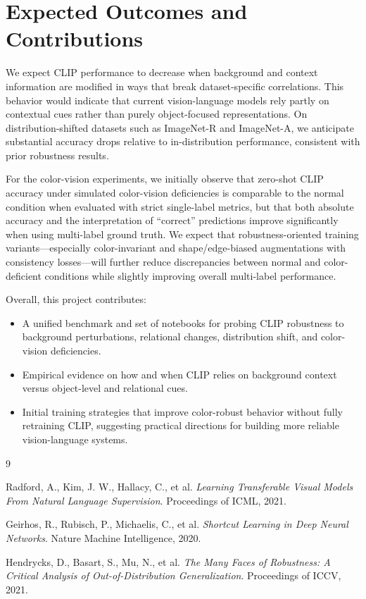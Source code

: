 \documentclass[11pt]{article}
\begin{document}
\section{Expected Outcomes and Contributions}

We expect CLIP performance to decrease when background and context information are modified in ways that break dataset-specific correlations. This behavior would indicate that current vision-language models rely partly on contextual cues rather than purely object-focused representations. On distribution-shifted datasets such as ImageNet-R and ImageNet-A, we anticipate substantial accuracy drops relative to in-distribution performance, consistent with prior robustness results.

For the color-vision experiments, we initially observe that zero-shot CLIP accuracy under simulated color-vision deficiencies is comparable to the normal condition when evaluated with strict single-label metrics, but that both absolute accuracy and the interpretation of ``correct'' predictions improve significantly when using multi-label ground truth. We expect that robustness-oriented training variants---especially color-invariant and shape/edge-biased augmentations with consistency losses---will further reduce discrepancies between normal and color-deficient conditions while slightly improving overall multi-label performance.

Overall, this project contributes:
\begin{itemize}
    \item A unified benchmark and set of notebooks for probing CLIP robustness to background perturbations, relational changes, distribution shift, and color-vision deficiencies.
    \item Empirical evidence on how and when CLIP relies on background context versus object-level and relational cues.
    \item Initial training strategies that improve color-robust behavior without fully retraining CLIP, suggesting practical directions for building more reliable vision-language systems.
\end{itemize}

\begin{thebibliography}{9}

Radford, A., Kim, J. W., Hallacy, C., et al.
\textit{Learning Transferable Visual Models From Natural Language Supervision}.
Proceedings of ICML, 2021.

Geirhos, R., Rubisch, P., Michaelis, C., et al.
\textit{Shortcut Learning in Deep Neural Networks}.
Nature Machine Intelligence, 2020.

Hendrycks, D., Basart, S., Mu, N., et al.
\textit{The Many Faces of Robustness: A Critical Analysis of Out-of-Distribution Generalization}.
Proceedings of ICCV, 2021.

\end{thebibliography}
\end{document}
